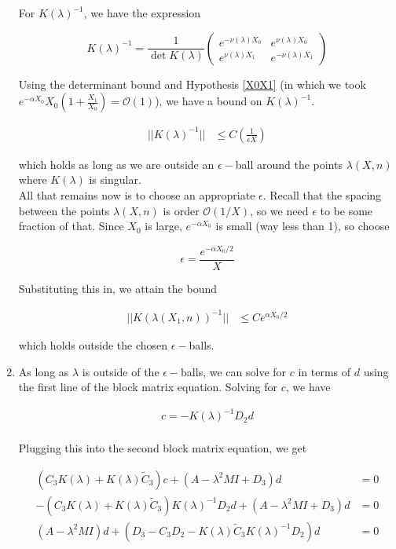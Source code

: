 \documentclass[12pt]{article}
\begin{document}
\begin{enumerate}
For $K(\lambda)^{-1}$, we have the expression

\begin{equation}
K(\lambda)^{-1} = \frac{1}{\det K(\lambda) }
\begin{pmatrix}
e^{-\nu(\lambda)X_0} & e^{\nu(\lambda)X_0} \\
e^{\nu(\lambda)X_1} & e^{-\nu(\lambda)X_1}
\end{pmatrix}
\end{equation}

Using the determinant bound and Hypothesis \ref{X0X1} (in which we took $e^{-\alpha X_0}X_0\left( 1 + \frac{X_1}{X_0} \right) = \mathcal{O}(1)$), we have a bound on $K( \lambda )^{-1}$.

\begin{align*}
|| K( \lambda )^{-1}|| 
&\leq C \left( \frac{1}{\epsilon X} \right)
\end{align*}

which holds as long as we are outside an $\epsilon-$ball around the points $\lambda(X,n)$ where $K(\lambda)$ is singular.\\

All that remains now is to choose an appropriate $\epsilon$. Recall that the spacing between the points $\lambda(X, n)$ is order $\mathcal{O}(1/X)$, so we need $\epsilon$ to be some fraction of that. Since $X_0$ is large, $e^{-\alpha X_0}$ is small (way less than 1), so choose

\[
\epsilon = \frac{e^{-\alpha X_0/2}}{X}
\]

Substituting this in, we attain the bound

\begin{align*}
|| K( \lambda(X_1, n))^{-1}|| 
&\leq C e^{\alpha X_0/2}
\end{align*}

which holds outside the chosen $\epsilon-$balls.

\item As long as $\lambda$ is outside of the $\epsilon-$balls, we can solve for $c$ in terms of $d$ using the first line of the block matrix equation. Solving for $c$, we have

\begin{align*}
c = -K(\lambda)^{-1} D_2 d \\
\end{align*}

Plugging this into the second block matrix equation, we get

\begin{align*}
(C_3 K(\lambda) + K(\lambda) \tilde{C}_3) c + (A - \lambda^2 MI + D_3)d &= 0 \\
-(C_3 K(\lambda) + K(\lambda) \tilde{C}_3)K(\lambda)^{-1} D_2 d + (A - \lambda^2 MI + D_3)d &= 0 \\
(A - \lambda^2 MI )d + (D_3 - C_3 D_2 - K(\lambda) \tilde{C}_3 K(\lambda)^{-1} D_2) d &= 0 \\
\end{align*}


\end{enumerate}
\end{document}
